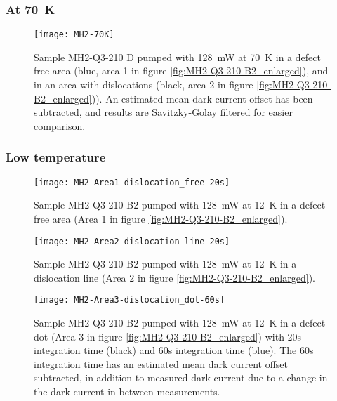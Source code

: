 \subsubsection{At 70~K}
\begin{figure}[H]
\centering
\texttt{[image: MH2-70K]}
\caption[MH2-Q3-210 at 70K]{Sample MH2-Q3-210 D pumped with 128~mW at 70~K in a defect free area (blue, area 1 in figure \ref{fig:MH2-Q3-210-B2_enlarged}), and in an area with dislocations (black, area 2 in figure \ref{fig:MH2-Q3-210-B2_enlarged})). An estimated mean dark current offset has been subtracted, and results are Savitzky-Golay filtered for easier comparison.}
\label{fig:MH2-70K}%
\end{figure}

\subsubsection{Low temperature}

\begin{figure}[H]
\centering
\texttt{[image: MH2-Area1-dislocation\_free-20s]}
\caption[MH2-Q3-210 at area 1]{Sample MH2-Q3-210 B2 pumped with 128~mW at 12~K in a defect free area (Area 1 in figure \ref{fig:MH2-Q3-210-B2_enlarged}).}
\label{fig:MH2-Area1-dislocation_free-20s}%
\end{figure}

\begin{figure}[H]
\centering
\texttt{[image: MH2-Area2-dislocation\_line-20s]}
\caption[MH2-Q3-210 at area 2]{Sample MH2-Q3-210 B2 pumped with 128~mW at 12~K in a dislocation line (Area 2 in figure \ref{fig:MH2-Q3-210-B2_enlarged}).}
\label{fig:MH2-Area2-dislocation_line-20s}%
\end{figure}

\begin{figure}[H]
\centering
\texttt{[image: MH2-Area3-dislocation\_dot-60s]}
\caption[MH2-Q3-210 at area 3]{Sample MH2-Q3-210 B2 pumped with 128~mW at 12~K in a defect dot (Area 3 in figure \ref{fig:MH2-Q3-210-B2_enlarged}) with 20s integration time (black) and 60s integration time (blue). The 60s integration time has an estimated mean dark current offset subtracted, in addition to measured dark current due to a change in the dark current in between measurements.}
\label{fig:MH2-Area3-dislocation_dot-60s}%
\end{figure}


